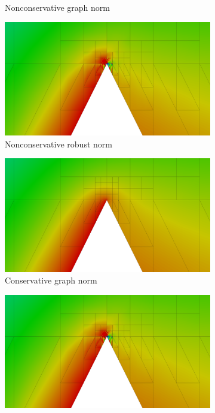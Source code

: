 \documentclass[mathserif]{beamer}
\begin{document}
\begin{frame}
{\begin{figure}
\begin{subfigure}[t]{0.45\textwidth}
\caption*{Nonconservative graph norm}
\end{subfigure}
\begin{subfigure}[t]{0.45\textwidth}
\centering
\includegraphics[width=\textwidth]{../figs/Wedge/robust16nc_zoom.png}
\caption*{Nonconservative robust norm}
\end{subfigure}
\begin{subfigure}[t]{0.45\textwidth}
\centering
\includegraphics[width=\textwidth]{../figs/Wedge/graph16c_zoom.png}
\caption*{Conservative graph norm}
\end{subfigure}
\begin{subfigure}[t]{0.45\textwidth}
\centering
\includegraphics[width=\textwidth]{../figs/Wedge/robust16c_zoom.png}

\end{subfigure}
\end{figure}}
\end{frame}
\end{document}
